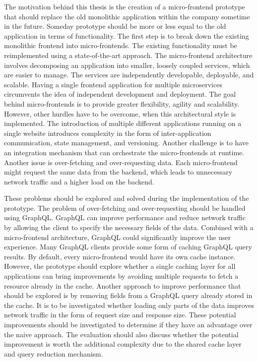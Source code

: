 The motivation behind this thesis is the creation of a micro-frontend prototype that should replace the old monolithic application within the company sometime in the future. Someday prototype should be more or less equal to the old application in terms of functionality. The first step is to break down the existing monolithic frontend into micro-frontends. The existing functionality must be reimplemented using a state-of-the-art approach. The micro-frontend architecture involves decomposing an application into smaller, loosely coupled services, which are easier to manage. The services are independently developable, deployable, and scalable. Having a single frontend application for multiple microservices circumvents the idea of independent development and deployment. The goal behind micro-frontends is to provide greater flexibility, agility and scalability. However, other hurdles have to be overcome, when this architectural style is implemented. The introduction of multiple different applications running on a single website introduces complexity in the form of inter-application communication, state management, and versioning. Another challenge is to have an integration mechanism that can orchestrate the micro-frontends at runtime. Another issue is over-fetching and over-requesting data. Each micro-frontend might request the same data from the backend, which leads to unnecessary network traffic and a higher load on the backend.

\bigskip

\noindent These problems should be explored and solved during the implementation of the prototype. The problem of over-fetching and over-requesting should be handled using GraphQL. GraphQL can improve performance and reduce network traffic by allowing the client to specify the necessary fields of the data. Combined with a micro-frontend architecture, GraphQL could significantly improve the user experience. Many GraphQL clients provide some form of caching GraphQL query results. By default, every micro-frontend would have its own cache instance. However, the prototype should explore whether a single caching layer for all applications can bring improvements by avoiding multiple requests to fetch a resource already in the cache. Another approach to improve performance that should be explored is by removing fields from a GraphQL query already stored in the cache. It is to be investigated whether loading only parts of the data improves network traffic in the form of request size and response size. These potential improvements should be investigated to determine if they have an advantage over the naive approach. The evaluation should also discuss whether the potential improvement is worth the additional complexity due to the shared cache layer and query reduction mechanism.

